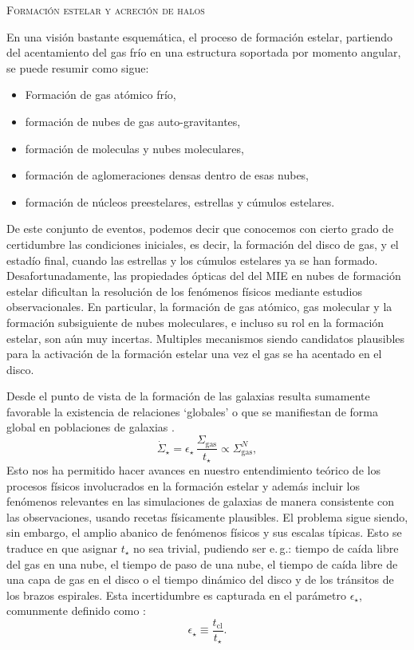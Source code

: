 \documentclass[xcolor=dvipsnames,4pt,hyperref={colorlinks,citecolor=black,linkcolor=black,urlcolor=black}]{beamer}
\begin{document}
\begin{frame}[allowframebreaks]{\textsc{Formación estelar y acreción de halos}}
\begin{description}
En una visión bastante esquemática, el proceso de formación estelar, partiendo del acentamiento del
gas frío en una estructura soportada por momento angular, se puede resumir como sigue:
\begin{itemize}
\item Formación de gas atómico frío,
\item formación de nubes de gas auto-gravitantes,
\item formación de moleculas y nubes moleculares,
\item formación de aglomeraciones densas dentro de esas nubes,
\item formación de núcleos preestelares, estrellas y cúmulos estelares.
\end{itemize}
De este conjunto de eventos, podemos decir que conocemos con cierto grado de certidumbre las
condiciones iniciales, es decir, la formación del disco de gas, y el estadío final, cuando las
estrellas y los cúmulos estelares ya se han formado. Desafortunadamente, las propiedades ópticas del
del MIE en nubes de formación estelar dificultan la resolución de los fenómenos físicos mediante
estudios observacionales. En particular, la formación de gas atómico, gas molecular y la formación
subsiguiente de nubes moleculares, e incluso su rol en la formación estelar, son aún muy incertas.
Multiples mecanismos siendo candidatos plausibles para la activación de la formación estelar una vez
el gas se ha acentado en el disco.

Desde el punto de vista de la formación de las galaxias resulta sumamente favorable la existencia de
relaciones `globales' o que se manifiestan de forma global en poblaciones de galaxias
\citep[e.\,g.][]{Schmidt1959, Kennicutt1998, Kennicutt2012}.
$$
\dot{\Sigma}_\star = \epsilon_\star\,\frac{\Sigma_\text{gas}}{t_\star}\propto\Sigma_\text{gas}^N,
$$
%
Esto nos ha permitido hacer avances en nuestro entendimiento teórico de los procesos físicos
involucrados en la formación estelar \citep{Krumholz2014} y además incluir los fenómenos relevantes
en las simulaciones de galaxias de manera consistente con las observaciones, usando recetas
físicamente plausibles. El problema sigue siendo, sin embargo, el amplio abanico de fenómenos
físicos y sus escalas típicas. Esto se traduce en que asignar $t_\star$ no sea trivial, pudiendo ser
e.\,g.: tiempo de caída libre del gas en una nube, el tiempo de paso de una nube, el tiempo de caída
libre de una capa de gas en el disco o el tiempo dinámico del disco y de los tránsitos de los brazos
espirales. Esta incertidumbre es capturada en el parámetro $\epsilon_\star$, comunmente definido
como \citep{Krumholz2014}:
$$
\epsilon_\star \equiv \frac{t_\text{cl}}{t_\star}.
$$


\end{description}
\end{frame}
\end{document}
